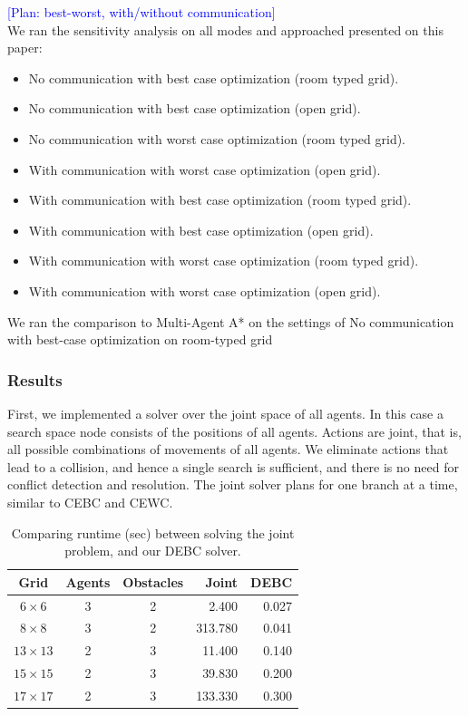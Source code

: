 \documentclass[letterpaper]{article} %
\newcommand{\plan}[1]{{\textcolor{blue}{[Plan: #1]}}}
\begin{document}
{\plan{best-worst, with/without communication}
\\We ran the sensitivity analysis on all modes and approached presented on this paper: 
\begin{itemize}
  \item No communication with best case optimization (room typed grid). \item No communication with best case optimization (open grid).
  \item No communication with worst case optimization (room typed grid). 
  \item With communication with worst case optimization (open grid).
  \item With communication with best case optimization (room typed grid). 
  \item With communication with best case optimization (open grid).
  \item With communication with worst case optimization (room typed grid). 
  \item With communication with worst case optimization (open grid).
\end{itemize}

We ran the comparison to Multi-Agent A* on the settings of No communication with best-case optimization on room-typed grid 
}

\subsubsection{Results}

First, we implemented a solver over the joint space of all agents. In this case a search space node consists of the positions of all agents. Actions are joint, that is, all possible combinations of movements of all agents. We eliminate actions that lead to a collision, and hence a single search is sufficient, and there is no need for conflict detection and resolution. The joint solver plans for one branch at a time, similar to CEBC and CEWC.

\begin{table}[t]
\centering
\scriptsize
\begin{tabular}{| c | c | c | r | r |}
\hline
Grid & Agents & Obstacles & Joint & DEBC \\ \hline
$6 \times 6$ & 3   & 2 & 2.400 & 0.027 \\ \hline
$8 \times 8$ & 3   & 2 & 313.780 & 0.041 \\ \hline
$13 \times 13$ & 2   & 3 & 11.400 & 0.140 \\ \hline
$15 \times 15$ & 2   & 3 & 39.830 & 0.200 \\ \hline
$17 \times 17$ & 2   & 3 & 133.330 & 0.300 \\ \hline
\end{tabular}
\caption{Comparing runtime (sec) between solving the joint problem, and our DEBC solver.}
\label{tbl:joint}
\end{table}
\end{document}
